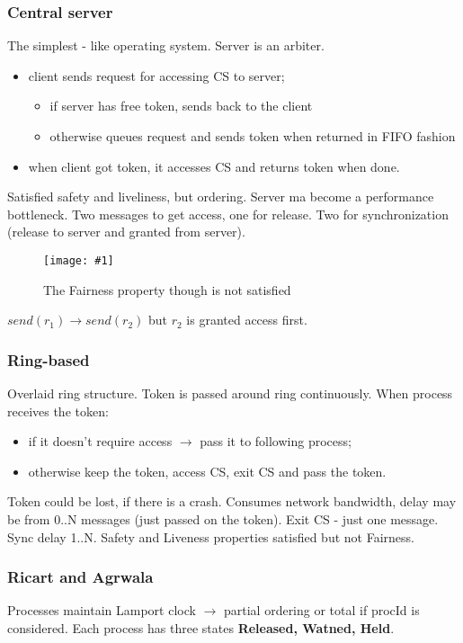 \documentclass[10pt,a4paper]{article}
\newcommand{\insImg}[2] { %
	\begin{figure}[ht!] %
		\centering %
		\texttt{[image: \#1]} %
		\caption{#2} %
		\label{overflow} %
	\end{figure} %
}
\begin{document}
\subsubsection{Central server}
The simplest - like operating system. Server is an arbiter. 
\begin{itemize}
	\item client sends request for accessing CS to server;
	\begin{itemize}
		\item if server has free token, sends back to the client 
		\item otherwise queues request and sends token when returned in FIFO fashion
	\end{itemize}
	\item when client got token, it accesses CS and returns token when done.
\end{itemize}
Satisfied safety and liveliness, but ordering. Server ma become a performance bottleneck. Two messages to get access, one for release. Two for synchronization (release to server and granted from server).

\insImg{central_server_fairness}{The Fairness property though is not satisfied}

$send(r_1) \rightarrow send(r_2)$ but $r_2$ is granted access first.

\subsubsection{Ring-based}
Overlaid ring structure. Token is passed around ring continuously. When process receives the token:
\begin{itemize}
	\item if it doesn't require access $\rightarrow$ pass it to following process;
	\item otherwise keep the token, access CS, exit CS and pass the token.
\end{itemize}

Token could be lost, if there is a crash. Consumes network bandwidth, delay may be from 0..N messages (just passed on the token). Exit CS - just one message. Sync delay 1..N. Safety and Liveness properties satisfied but not Fairness.

\subsubsection{Ricart and Agrwala}

Processes maintain Lamport clock $\rightarrow$ partial ordering or total if procId is considered. Each process has three states \textbf{Released, Watned, Held}.
\end{document}
